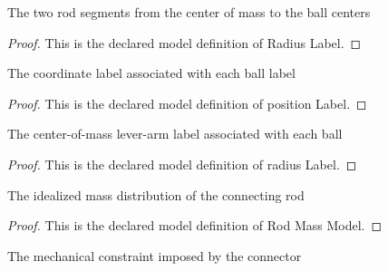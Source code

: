 \begin{definition}
  \label{def:physics:phyx-mini-0696:phyxminiproblems-problemphyxmini0696-radiuslabel}
  The two rod segments from the center of mass to the ball centers
\end{definition}
\begin{proof}
  This is the declared model definition of Radius Label.
\end{proof}
\begin{definition}
  \label{def:physics:phyx-mini-0696:phyxminiproblems-problemphyxmini0696-ball-positionlabel}
  The coordinate label associated with each ball label
\end{definition}
\begin{proof}
  This is the declared model definition of position Label.
\end{proof}
\begin{definition}
  \label{def:physics:phyx-mini-0696:phyxminiproblems-problemphyxmini0696-ball-radiuslabel}
  The center-of-mass lever-arm label associated with each ball
\end{definition}
\begin{proof}
  This is the declared model definition of radius Label.
\end{proof}
\begin{definition}
  \label{def:physics:phyx-mini-0696:phyxminiproblems-problemphyxmini0696-rodmassmodel}
  The idealized mass distribution of the connecting rod
\end{definition}
\begin{proof}
  This is the declared model definition of Rod Mass Model.
\end{proof}
\begin{definition}
  \label{def:physics:phyx-mini-0696:phyxminiproblems-problemphyxmini0696-connectormodel}
  The mechanical constraint imposed by the connector
\end{definition}
